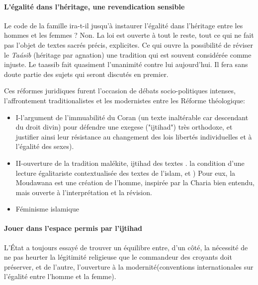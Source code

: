 \paragraph{L'égalité dans l'héritage, une revendication sensible}

 Le code de la famille ira-t-il jusqu'à instaurer l'égalité dans l'héritage entre les hommes et les femmes  ? Non.
 La loi est ouverte à tout le reste, tout ce qui ne fait pas l'objet de 
textes sacrés précis, explicites. Ce qui ouvre la possibilité de 
 réviser le \textit{Taásib} (héritage par agnation)  une tradition qui est souvent 
  considérée comme injuste. Le taassib fait quasiment l'unanimité contre lui aujourd'hui. Il fera sans doute partie des sujets qui seront discutés en premier.

 Ces réformes juridiques furent l'occasion de débats socio-politiques intenses, l'affrontement traditionalistes et les modernistes entre les Réforme
théologique:

\begin{itemize}
    \item   I-l'argument de l'immuabilité du Coran (un texte inaltérable car descendant du droit divin) pour défendre une exegese ("ijtihad") très orthodoxe, et justifier ainsi leur résistance au changement des lois libertés individuelles et à l'égalité des sexes).


\item II-ouverture de la tradition malékite, ijtihad des textes . la condition d'une lecture égalitariste contextualisée des textes de l'islam, et
) Pour eux, la Moudawana est une création de l'homme, inspirée par la Charia bien entendu, mais ouverte à l'interprétation et la révision.
\item 
Féminisme islamique

\end{itemize}

\paragraph{Jouer dans l'espace permis par l'ijtihad}
L'État a toujours essayé de trouver un équilibre entre, d'un côté, la nécessité de ne pas heurter la légitimité religieuse que le commandeur des croyants doit préserver, et de l'autre, l'ouverture à la modernité(conventions internationales sur l'égalité entre l'homme et la femme).

